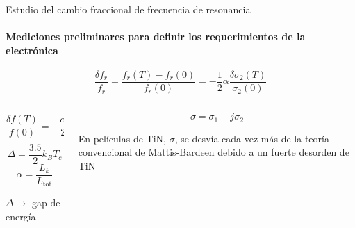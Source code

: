 \documentclass[ignorenonframetext,12pt]{beamer}
\begin{document}
%
\begin{frame}{Estudio del cambio fraccional de frecuencia de resonancia}
				\framesubtitle{Mediciones preliminares para definir los requerimientos
				de la electrónica}
												\begin{equation*}
																\frac{\delta f_r}{f_r} = \frac{f_r(T) -
																f_r(0)}{f_r(0)} = -\frac{1}{2}\alpha\frac{\delta
																\sigma_2(T)}{\sigma_2(0)}
												\end{equation*}
				\begin{columns}
								\begin{column}{0.49\textwidth}
												{\color{blue}\begin{equation*}
								\frac{\delta f(T)}{f(0)} = 
																-\frac{\alpha}{2}\sqrt{\frac{\pi \Delta}{2 k_B
																T}} e^{-\frac{\Delta}{k_B T}}
												\end{equation*}}
				\begin{equation*}
								\Delta = \frac{3.5}{2} k_B T_c
				\end{equation*}
				\begin{equation*}
								\alpha = \frac{L_k}{L_\text{tot}}
				\end{equation*}

												$\Delta \to$ gap de energía
								\end{column}
				\begin{column}{0.49\textwidth}
				\begin{equation*}
								\sigma = \sigma_1 - j \sigma_2
				\end{equation*}

								En películas de TiN, $\sigma$, se desvía cada vez más de la
								teoría convencional	de Mattis-Bardeen debido a un \alert{fuerte
								desorden de TiN}
								\end{column}
								\end{columns}
\end{frame}
\end{document}
